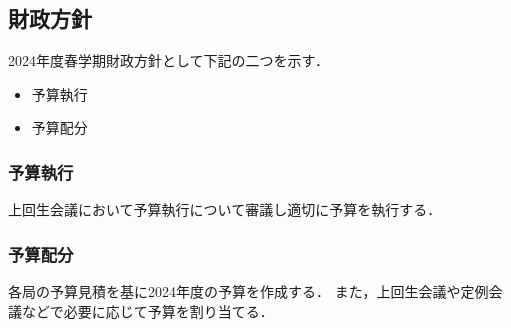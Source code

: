 \subsection*{財政方針}


2024年度春学期財政方針として下記の二つを示す．
\begin{itemize}
    \item 予算執行
    \item 予算配分
\end{itemize}

\subsubsection*{予算執行}
上回生会議において予算執行について審議し適切に予算を執行する．

\subsubsection*{予算配分}
各局の予算見積を基に2024年度の予算を作成する．
また，上回生会議や定例会議などで必要に応じて予算を割り当てる．

